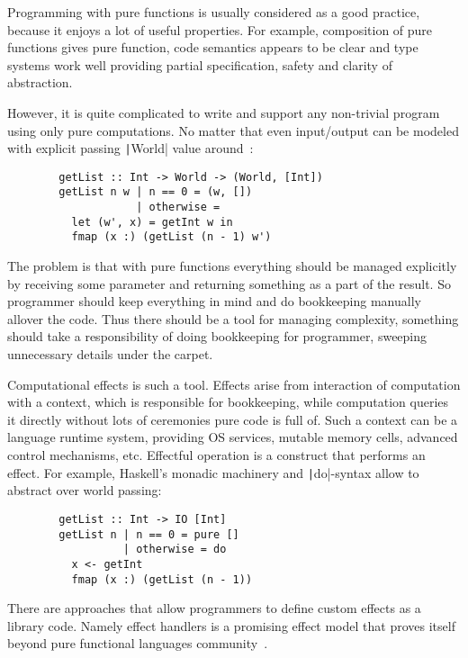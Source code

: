 \documentclass[conference]{IEEEtran}
\begin{document}
    Programming with pure functions is usually considered as a good practice, because it enjoys a lot of useful properties.
    For example, composition of pure functions gives pure function, code semantics appears to be clear and type systems work well providing partial specification, safety and clarity of abstraction.

    However, it is quite complicated to write and support any non-trivial program using only pure computations.
    No matter that even input/output can be modeled with explicit passing \texttt|World| value around~\cite{peyton1993imperative}:

    \begin{verbatim}
        getList :: Int -> World -> (World, [Int])
        getList n w | n == 0 = (w, [])
                    | otherwise =
          let (w', x) = getInt w in
          fmap (x :) (getList (n - 1) w')
    \end{verbatim}

    The problem is that with pure functions everything should be managed explicitly by receiving some parameter and returning something as a part of the result.
    So programmer should keep everything in mind and do bookkeeping manually allover the code.
    Thus there should be a tool for managing complexity, something should take a responsibility of doing bookkeeping for programmer, sweeping unnecessary details under the carpet.

    Computational effects is such a tool.
    Effects arise from interaction of computation with a context, which is responsible for bookkeeping, while computation queries it directly without lots of ceremonies pure code is full of.
    Such a context can be a language runtime system, providing OS services, mutable memory cells, advanced control mechanisms, etc.
    Effectful operation is a construct that performs an effect.
    For example, Haskell's monadic machinery and \texttt|do|-syntax allow to abstract over world passing:

    \begin{verbatim}
        getList :: Int -> IO [Int]
        getList n | n == 0 = pure []
                  | otherwise = do
          x <- getInt
          fmap (x :) (getList (n - 1))
    \end{verbatim}

    There are approaches that allow programmers to define custom effects as a library code.
    Namely effect handlers is a promising effect model that proves itself beyond pure functional languages community~\cite{plotkin2013handling, chandrasekaran2018algebraic}.
\end{document}
